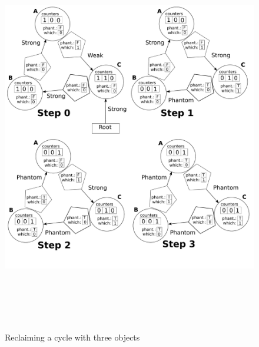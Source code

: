 \begin{figure}[!t]
  \centering
  {\includegraphics[height=6.5in]{figs/method}\label{fig:example1}}
  \caption{Reclaiming a cycle with three objects}%
  \label{ex1}
\end{figure}

